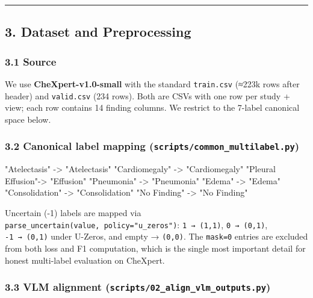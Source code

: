 \documentclass[
  11pt,
]{article}
\newenvironment{Shaded}{}{}
\newcommand{\NormalTok}[1]{#1}
\begin{document}
\begin{center}\rule{0.5\linewidth}{0.5pt}\end{center}

\subsection{3. Dataset and
Preprocessing}\label{dataset-and-preprocessing}

\subsubsection{3.1 Source}\label{source}

We use \textbf{CheXpert-v1.0-small} with the standard \texttt{train.csv}
(≈223k rows after header) and \texttt{valid.csv} (234 rows). Both are
CSVs with one row per study + view; each row contains 14 finding
columns. We restrict to the 7-label canonical space below.

\subsubsection{\texorpdfstring{3.2 Canonical label mapping
(\texttt{scripts/common\_multilabel.py})}{3.2 Canonical label mapping (scripts/common\_multilabel.py)}}\label{canonical-label-mapping-scriptscommon_multilabel.py}

\begin{Shaded}
\begin{Highlighting}[]
\NormalTok{"Atelectasis"     {-}\textgreater{} "Atelectasis"}
\NormalTok{"Cardiomegaly"    {-}\textgreater{} "Cardiomegaly"}
\NormalTok{"Pleural Effusion"{-}\textgreater{} "Effusion"}
\NormalTok{"Pneumonia"       {-}\textgreater{} "Pneumonia"}
\NormalTok{"Edema"           {-}\textgreater{} "Edema"}
\NormalTok{"Consolidation"   {-}\textgreater{} "Consolidation"}
\NormalTok{"No Finding"      {-}\textgreater{} "No Finding"}
\end{Highlighting}
\end{Shaded}

Uncertain (-1) labels are mapped via
\texttt{parse\_uncertain(value,\ policy="u\_zeros")}:
\texttt{1\ →\ (1,1)}, \texttt{0\ →\ (0,1)}, \texttt{-1\ →\ (0,1)} under
U-Zeros, and empty → \texttt{(0,0)}. The \texttt{mask=0} entries are
excluded from both loss and F1 computation, which is the single most
important detail for honest multi-label evaluation on CheXpert.

\subsubsection{\texorpdfstring{3.3 VLM alignment
(\texttt{scripts/02\_align\_vlm\_outputs.py})}{3.3 VLM alignment (scripts/02\_align\_vlm\_outputs.py)}}\label{vlm-alignment-scripts02_align_vlm_outputs.py}
\end{document}
